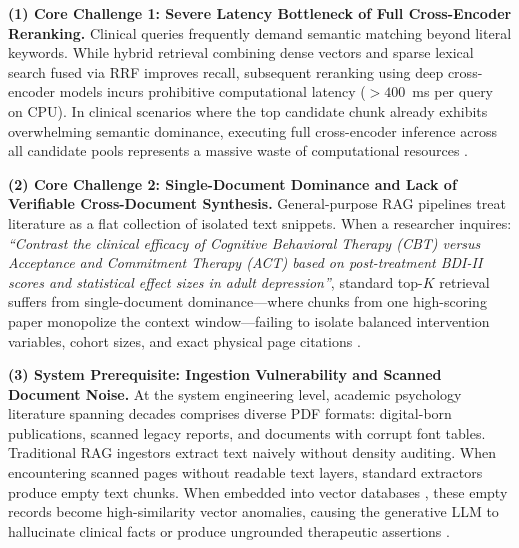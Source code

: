 \documentclass[10pt]{SPIIRAS_Proceedings}
\begin{document}
\textbf{(1) Core Challenge 1: Severe Latency Bottleneck of Full Cross-Encoder Reranking.} Clinical queries frequently demand semantic matching beyond literal keywords. While hybrid retrieval combining dense vectors \cite{wang2022text} and sparse lexical search \cite{robertson2009probabilistic} fused via RRF \cite{cormack2009reciprocal} improves recall, subsequent reranking using deep cross-encoder models \cite{chen2024bge,xiao2023cpack} incurs prohibitive computational latency ($>400$~ms per query on CPU). In clinical scenarios where the top candidate chunk already exhibits overwhelming semantic dominance, executing full cross-encoder inference across all candidate pools represents a massive waste of computational resources \cite{gao2024modular}.

\textbf{(2) Core Challenge 2: Single-Document Dominance and Lack of Verifiable Cross-Document Synthesis.} General-purpose RAG pipelines \cite{izacard2021leveraging,liu2023llamaindex} treat literature as a flat collection of isolated text snippets. When a researcher inquires: \textit{``Contrast the clinical efficacy of Cognitive Behavioral Therapy (CBT) versus Acceptance and Commitment Therapy (ACT) based on post-treatment BDI-II \cite{beck1996manual} scores and statistical effect sizes \cite{cohen1988statistical} in adult depression''}, standard top-$K$ retrieval suffers from single-document dominance---where chunks from one high-scoring paper monopolize the context window---failing to isolate balanced intervention variables, cohort sizes, and exact physical page citations \cite{moher2009preferred}.

\textbf{(3) System Prerequisite: Ingestion Vulnerability and Scanned Document Noise.} At the system engineering level, academic psychology literature spanning decades comprises diverse PDF formats: digital-born publications, scanned legacy reports, and documents with corrupt font tables. Traditional RAG ingestors \cite{lewis2020retrieval,gao2023retrieval} extract text naively without density auditing. When encountering scanned pages without readable text layers, standard extractors produce empty text chunks. When embedded into vector databases \cite{wang2022text}, these empty records become high-similarity vector anomalies, causing the generative LLM to hallucinate clinical facts or produce ungrounded therapeutic assertions \cite{yan2024corrective}.
\end{document}
